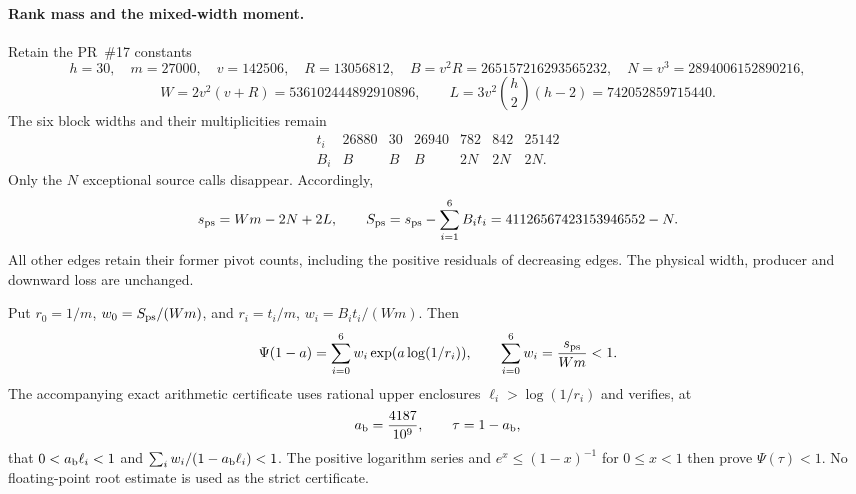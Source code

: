 \paragraph{Rank mass and the mixed-width moment.}
Retain the PR~\#17 constants
\[
 h=30,\quad m=27000,\quad v=142506,\quad R=13056812,
 \quad B=v^2R=265157216293565232,\quad
 N=v^3=2894006152890216,
\]
\[
 W=2v^2(v+R)=536102444892910896,\qquad
 L=3v^2\binom h2(h-2)=742052859715440.
\]
The six block widths and their multiplicities remain
\[
\begin{array}{c|rrrrrr}
 t_i&26880&30&26940&782&842&25142\\\hline
 B_i&B&B&B&2N&2N&2N.
\end{array}
\]
Only the $N$ exceptional source calls disappear. Accordingly,
\[
 s_{\rm ps}=Wm-2N+2L,\qquad
 S_{\rm ps}=s_{\rm ps}-\sum_{i=1}^6B_it_i
            =41126567423153946552-N.
\]
All other edges retain their former pivot counts, including the
positive residuals of decreasing edges. The physical width, producer
and downward loss are unchanged.

Put $r_0=1/m$, $w_0=S_{\rm ps}/(Wm)$, and
$r_i=t_i/m$, $w_i=B_it_i/(Wm)$. Then
\[
 \Psi(1-a)=\sum_{i=0}^6 w_i\exp(a\log(1/r_i)),\qquad
 \sum_{i=0}^6w_i=\frac{s_{\rm ps}}{Wm}<1.
\]
The accompanying exact arithmetic certificate uses rational upper
enclosures $\ell_i>\log(1/r_i)$ and verifies, at
\[
 a_{\rm b}=\frac{4187}{10^9},\qquad \tau=1-a_{\rm b},
\]
that $0<a_{\rm b}\ell_i<1$ and
$\sum_iw_i/(1-a_{\rm b}\ell_i)<1$. The positive logarithm series and
$e^x\le(1-x)^{-1}$ for $0\le x<1$ then prove $\Psi(\tau)<1$.
No floating-point root estimate is used as the strict certificate.

